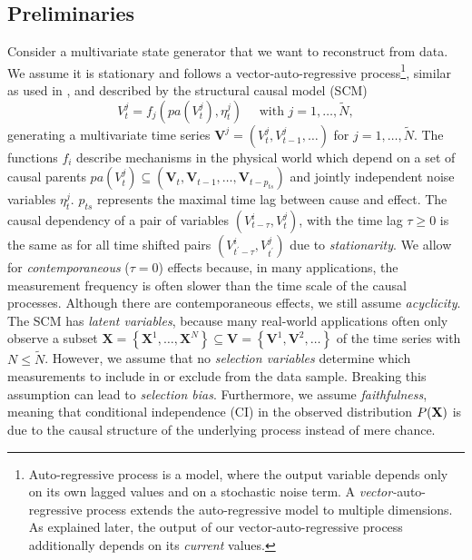 \documentclass[conference]{IEEEtran}
\begin{document}
\subsection{Preliminaries}
Consider a multivariate state generator that we want to reconstruct from data.
We assume it is stationary and follows a vector-auto-regressive process\footnote{Auto-regressive process is a model, where the output variable depends only on its own lagged values and on a stochastic noise term. A \textit{vector-}auto-regressive process extends the auto-regressive model to multiple dimensions. As explained later, the output of our vector-auto-regressive process additionally depends on its \textit{current} values.}, similar as used in \cite{gerhardus_high-recall_2021}, and described by the structural causal model (SCM)
\begin{equation}
V_{t}^{j}=f_{j}\left(pa\left(V_{t}^{j}\right), \eta_{t}^{j}\right) \quad \text { with } j=1, \ldots, \tilde{N},
\end{equation}
generating a multivariate time series $\mathbf{V}^{j}=\left(V_{t}^{j}, V_{t-1}^{j}, \ldots\right)$ for $j=1, \ldots, \tilde{N}$.
The functions $f_i$ describe mechanisms in the physical world which depend on a set of causal parents $p a\left(V_{t}^{j}\right) \subseteq\left(\mathbf{V}_{t}, \mathbf{V}_{t-1}, \ldots, \mathbf{V}_{t-p_{t s}}\right)$ and jointly independent noise variables $\eta_{t}^{j}$. $p_{t s}$ represents the maximal time lag between cause and effect.
The causal dependency of a pair of variables $\left(V_{t-\tau}^{i}, V_{t^{}}^{j}\right)$, with the time lag $\tau \geq 0$ is the same as for all time shifted pairs $\left(V_{t^{\prime}-\tau}^{i}, V_{t^{\prime}}^{j}\right)$ due to \textit{stationarity}.
We allow for \textit{contemporaneous} ($\tau=0$) effects because, in many applications, the measurement frequency is often slower than the time scale of the causal processes. Although there are contemporaneous effects, we still assume \textit{acyclicity}.
The SCM has \textit{latent variables}, because many real-world applications often only observe a subset $\mathbf{X}=\left\{\mathbf{X}^{1}, \ldots, \mathbf{X}^{N}\right\} \subseteq \mathbf{V}=\left\{\mathbf{V}^{1}, \mathbf{V}^{2}, \ldots\right\}$ of the time series with $N \leq \tilde{N}$. 
However, we assume that no \textit{selection variables} determine which measurements to include in or exclude from the data sample. Breaking this assumption can lead to \textit{selection bias}.
Furthermore, we assume \textit{faithfulness}, meaning that conditional independence (CI) in the observed distribution $P(\bf{X})$ is due to the causal structure of the underlying process instead of mere chance.
\end{document}
